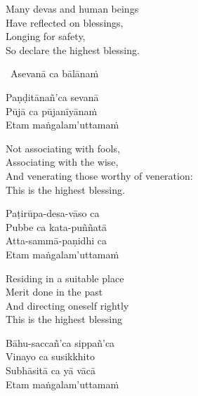 \begin{english-verses}
  Many devas and human beings\\
  Have reflected on blessings,\\
  Longing for safety,\\
  So declare the highest blessing.
\end{english-verses}

\begin{leader}
  \anglebracketleft\ \hspace{-0.5mm}Asevanā ca bālānaṁ \hspace{-0.5mm}\anglebracketright\
\end{leader}

\vspace{-0.99em}

\begin{pali-hang-continued}
  Paṇḍitānañ'ca sevanā\\
  Pūjā ca pūjanīyānaṁ\\
  Etam maṅgalam'uttamaṁ
\end{pali-hang-continued}

\begin{english-verses}
  Not associating with fools,\\
  Associating with the wise,\\
  And venerating those worthy of veneration:\\
  This is the highest blessing.
\end{english-verses}

\begin{pali-hang-continued}
  Paṭirūpa-desa-vāso ca\\
  Pubbe ca kata-puññatā\\
  Atta-sammā-paṇidhi ca\\
  Etam maṅgalam'uttamaṁ
\end{pali-hang-continued}

\begin{english-verses}
  Residing in a suitable place\\
  Merit done in the past\\
  And directing oneself rightly\\
  This is the highest blessing
\end{english-verses}

\begin{pali-hang-continued}
  Bāhu-saccañ'ca sippañ'ca\\
  Vinayo ca susikkhito\\
  Subhāsitā ca yā vācā\\
  Etam maṅgalam'uttamaṁ
\end{pali-hang-continued}

